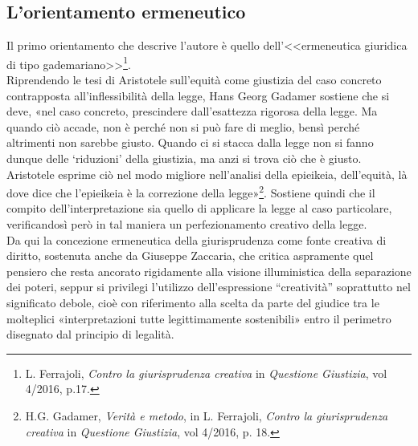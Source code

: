 \subsection{L'orientamento ermeneutico}
Il primo orientamento che descrive l'autore è quello dell’<<ermeneutica giuridica di tipo gademariano>>\footnote{L. Ferrajoli, \textit{Contro la giurisprudenza creativa} in \textit{Questione Giustizia}, vol 4/2016, p.17.}. 
\\Riprendendo le tesi di Aristotele sull’equità come giustizia del caso concreto contrapposta all’inflessibilità della legge, Hans Georg Gadamer sostiene che si deve, «nel caso concreto, prescindere dall’esattezza rigorosa della legge. Ma quando ciò accade, non è perché non si può fare di meglio, bensì perché altrimenti non sarebbe giusto. Quando ci si stacca dalla legge non si fanno dunque delle ‘riduzioni’ della giustizia, ma anzi si trova ciò che è giusto. Aristotele esprime ciò nel modo migliore nell’analisi della epieikeia, dell’equità, là dove dice che l’epieikeia è la correzione della legge»\footnote{H.G. Gadamer, \textit{Verità e metodo}, in L. Ferrajoli, \textit{Contro la giurisprudenza creativa} in \textit{Questione Giustizia}, vol 4/2016, p. 18.}.
Sostiene quindi che il compito dell'interpretazione sia quello di applicare la legge al caso particolare, verificandosì però in tal maniera un perfezionamento creativo della legge. 
\\Da qui la concezione ermeneutica della giurisprudenza come fonte creativa di diritto, sostenuta anche da Giuseppe Zaccaria, che critica aspramente quel pensiero che resta ancorato rigidamente alla visione illuministica della separazione dei poteri, seppur si privilegi l'utilizzo dell’espressione “creatività” soprattutto nel significato debole, cioè con riferimento alla scelta da parte del giudice tra le molteplici «interpretazioni tutte legittimamente sostenibili» entro il perimetro disegnato dal principio di legalità.

